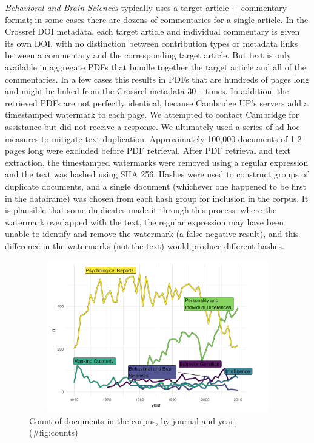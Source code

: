 \documentclass[12pt]{article}
\begin{document}
\emph{Behavioral and Brain Sciences} typically uses a target article + commentary format; in some cases there are dozens of commentaries for a single article. In the Crossref DOI metadata, each target article and individual commentary is given its own DOI, with no distinction between contribution types or metadata links between a commentary and the corresponding target article. But text is only available in aggregate PDFs that bundle together the target article and all of the commentaries. In a few cases this results in PDFs that are hundreds of pages long and might be linked from the Crossref metadata 30+ times. In addition, the retrieved PDFs are not perfectly identical, because Cambridge UP's servers add a timestamped watermark to each page. We attempted to contact Cambridge for assistance but did not receive a response. We ultimately used a series of ad hoc measures to mitigate text duplication. Approximately 100,000 documents of 1-2 pages long were excluded before PDF retrieval. After PDF retrieval and text extraction, the timestamped watermarks were removed using a regular expression and the text was hashed using SHA 256. Hashes were used to construct groups of duplicate documents, and a single document (whichever one happened to be first in the dataframe) was chosen from each hash group for inclusion in the corpus. It is plausible that some duplicates made it through this process: where the watermark overlapped with the text, the regular expression may have been unable to identify and remove the watermark (a false negative result), and this difference in the watermarks (not the text) would produce different hashes.

\begin{figure}
\centering
\includegraphics[width=4.76in,height=2.6in]{img/02_count.png}
\caption{Count of documents in the corpus, by journal and year. (\#fig:counts)}
\end{figure}
\end{document}
